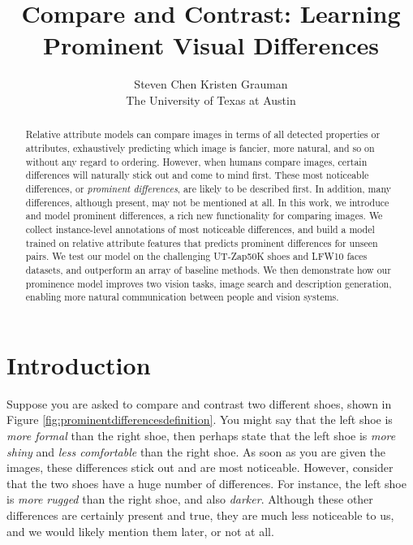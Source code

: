 \documentclass[10pt,twocolumn,letterpaper]{article}
\begin{document}

\title{Compare and Contrast: Learning Prominent Visual Differences}

\author{Steven Chen \qquad Kristen Grauman\\
The University of Texas at Austin\\
}

\maketitle



\begin{abstract}
Relative attribute models can compare images in terms of all detected properties or attributes, exhaustively predicting which image is fancier, more natural, and so on without any regard to ordering. However, when humans compare images, certain differences will naturally stick out and come to mind first. These most noticeable differences, or \emph{prominent differences}, are likely to be described first. In addition, many differences, although present, may not be mentioned at all. In this work, we introduce and model prominent differences, a rich new functionality for comparing images. We collect instance-level annotations of most noticeable differences, and build a model trained on relative attribute features that predicts prominent differences for unseen pairs. We test our model on the challenging UT-Zap50K shoes and LFW10 faces datasets, and outperform an array of baseline methods. We then demonstrate how our prominence model improves two vision tasks, image search and description generation, enabling more natural communication between people and vision systems.
\end{abstract}



\section{Introduction} \label{introduction}

Suppose you are asked to compare and contrast two different shoes, shown in Figure \ref{fig:prominentdifferencesdefinition}. You might say that the left shoe is \textit{more formal} than the right shoe, then perhaps state that the left shoe is \textit{more shiny} and \textit{less comfortable} than the right shoe. As soon as you are given the images, these differences stick out and are most noticeable. However, consider that the two shoes have a huge number of differences. For instance, the left shoe is \textit{more rugged} than the right shoe, and also \textit{darker}. Although these other differences are certainly present and true, they are much less noticeable to us, and we would likely mention them later, or not at all.
\end{document}
